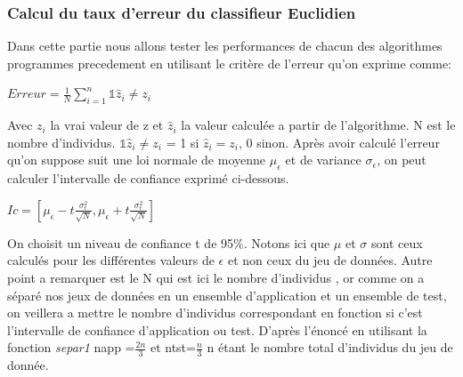 \documentclass[10pt]{article}
\begin{document}
			\subsubsection{Calcul du taux d'erreur du classifieur Euclidien }
			Dans cette partie nous allons tester les performances de chacun des algorithmes programmes precedement en utilisant le critère de l'erreur qu'on exprime comme:
			\begin{center}
			$Erreur = \frac{1}{N} \sum_{i=1}^{n} {\mathds{1} \hat{z}_{i}  \neq z_{i}}$
			\end{center}
		Avec $z_{i}$ la vrai valeur de z et $\hat{z}_{i}$ la valeur calculée a partir de l'algorithme. N est le nombre d'individus. $\mathds{1} \hat{z}_{i}  \neq z_{i}$ = 1 si $\hat{z}_{i}  = z_{i}$, 0 sinon.
		Après avoir calculé l'erreur qu'on suppose suit une loi normale de moyenne $\mu_{\epsilon}$ et de variance $\sigma_{\epsilon}$, on peut calculer l'intervalle de confiance exprimé ci-dessous.
		\begin{center}
		$Ic = [\mu_\epsilon - t \frac{\sigma_{\epsilon}^2}{\sqrt{N}}, \mu_\epsilon + t \frac{\sigma_{\epsilon}^2}{\sqrt{N}}]$
		\end{center}
	
		On choisit un niveau de confiance t de 95\%. Notons ici que  $\mu$ et $\sigma$ sont ceux calculés pour les différentes valeurs de $\epsilon$ et non ceux du jeu de données. Autre point a remarquer est le N qui est ici le nombre d'individus , or comme on a séparé nos jeux de données en un ensemble d'application et un ensemble de test, on veillera a mettre le nombre d'individus correspondant en fonction si c'est l'intervalle de confiance  d'application ou test. D'après l'énoncé en utilisant la fonction \textit{separ1} napp =$\frac{2n}{3}$  et ntst=$\frac{n}{3}$ n étant le nombre total d'individus du jeu de donnée.
			
\end{document}
